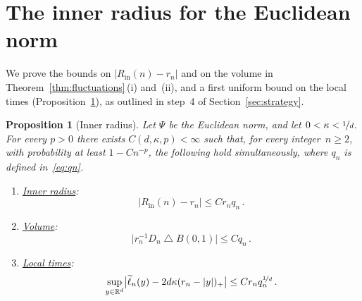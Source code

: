 \documentclass[11pt]{amsart}
\theoremstyle{plain}
\newtheorem{proposition}[theorem]{Proposition}
\theoremstyle{definition}
\newcommand{\R}{\mathbb R}
\newcommand{\drift}{\kappa}
\newcommand{\gauge}{\Psi}
\newcommand{\nf}{\nicefrac}
\newcommand{\Rin}{R_{\mathrm{in}}}
\numberwithin{equation}{section}
\begin{document}
\section{The inner radius for the Euclidean norm}\label{sec:contact}

We prove the bounds on $|\Rin(n)-r_n|$ and on the volume in Theorem~\ref{thm:fluctuations}\,(i) and~(ii), and a first uniform bound on the local times (Proposition~\ref{prop:inner}), as outlined in step~4 of Section~\ref{sec:strategy}.

\begin{proposition}[Inner radius]\label{prop:inner}
Let $\gauge$ be the Euclidean norm, and let $0<\drift<\nf1d$. For every $p>0$ there exists $C(d,\drift,p)<\infty$ such that, for every integer~$n\geq2$, with probability at least $1-Cn^{-p}$, the following hold simultaneously, where $q_n$ is defined in~\eqref{eq:qn}.
\begin{enumerate}[label=\textup{(\roman*)}]
\item \underline{\emph{Inner radius}}:
\begin{equation}\label{eq:inradius}
|\Rin(n)-r_n|\leq Cr_nq_n\, .
\end{equation}
\item \underline{\emph{Volume}}:
\begin{equation*}
\bigl|r_n^{-1}D_n\mathbin{\triangle}B(0,1)\bigr|\leq Cq_n\, .
\end{equation*}
\item \underline{\emph{Local times}}:
\begin{equation*}
\sup_{y\in\R^d}\bigl|\widetilde\ell_n(y)-2d\drift(r_n-|y|)_+\bigr|\leq Cr_nq_n^{\nf1d}\, .
\end{equation*}
\end{enumerate}
\end{proposition}
\end{document}
